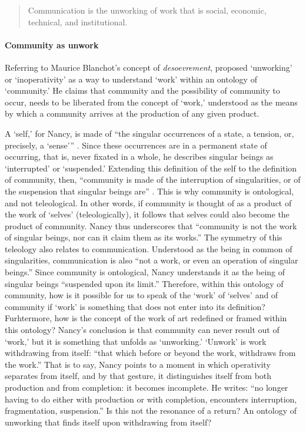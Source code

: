 \begin{quote}
	Communication is the unworking of work that is social, economic, technical, and institutional. \parencite[31]{Nan91:The} 
\end{quote} %

\paragraph{Community as unwork}
Referring to Maurice Blanchot's concept of \textit{desoevrement}, \textcite{Nan91:The} proposed `unworking' or `inoperativity' as a way to understand `work' within an ontology of `community.' He claims that community and the possibility of community to occur, needs to be liberated from the concept of `work,' understood as the means by which a community arrives at the production of any given product. 

A `self,' for Nancy, is made of ``the singular occurrences of a state, a tension, or, precisely, a `sense''' \parencite{Nan07:Lis}. Since these occurrences are in a permanent state of occurring, that is, never fixated in a whole, he describes singular beings as `interrupted' or `suspended.' Extending this definition of the self to the definition of community, then, ``community is made of the interruption of singularities, or of the suspension that singular beings are'' \parencite[31][All subsequent quotes from this passage]{Nan91:The}. This is why community is ontological, and not teleological. In other words, if community is thought of as a product of the work of `selves' (teleologically), it follows that selves could also become the product of community. Nancy thus underscores that ``community is not the work of singular beings, nor can it claim them as its works.'' The symmetry of this teleology also relates to communication. Understood as the being in common of singularities, communication is also ``not a work, or even an operation of singular beings.'' Since community is ontological, Nancy understands it as the being of singular beings ``suspended upon its limit.'' Therefore, within this ontology of community, how is it possible for us to speak of the `work' of `selves' and of community if `work' is something that does not enter into its definition? Furhtermore, how is the concept of the work of art redefined or framed within this ontology? Nancy's conclusion is that community can never result out of `work,' but it is something that unfolds as `unworking.' `Unwork' is work withdrawing from itself: ``that which before or beyond the work, withdraws from the work.'' That is to say, Nancy points to a moment in which operativity separates from itself, and by that gesture, it distinguishes itself from both production and from completion: it becomes incomplete. He writes: ``no longer having to do either with production or with completion, encounters interruption, fragmentation, suspension.'' Is this not the resonance of a return? An ontology of unworking that finds itself upon withdrawing from itself?

